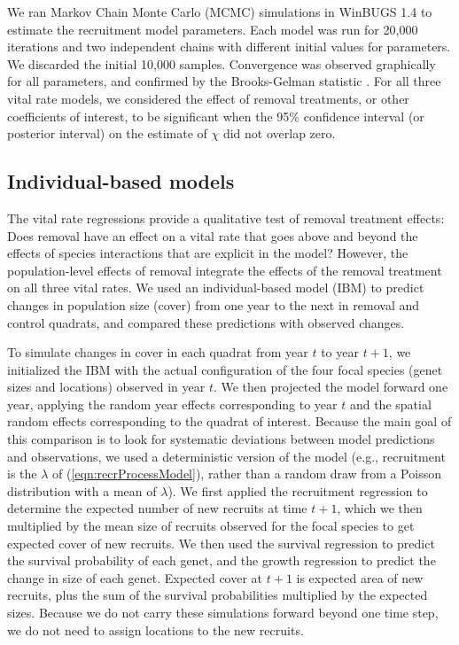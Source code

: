 \documentclass[11pt]{article}
\begin{document}
\begin{doublespacing}
We ran Markov Chain Monte Carlo (MCMC) simulations in WinBUGS 1.4 \citep{lunn_winbugs_2000} to estimate the recruitment model parameters. Each model was run for 20,000 iterations and two independent chains with different initial values for parameters. We discarded the initial 10,000 samples. Convergence was observed graphically for all parameters, and confirmed by the Brooks-Gelman statistic \citep{brooks_general_1998}. For all three vital rate models, we considered the effect of removal treatments, or other coefficients of interest, to be significant when the 95\% confidence interval (or posterior interval) on the estimate of $\chi$ did not overlap zero.  

\subsection*{Individual-based models}

The vital rate regressions provide a qualitative test of removal treatment effects: Does removal have an effect on a vital rate that goes above and beyond the effects of species interactions that are explicit in the model? However, the population-level effects of removal integrate the effects of the removal treatment on all three vital rates. We used an individual-based model (IBM) to predict changes in population size (cover) from one year to the next in removal and control quadrats, and compared these predictions with observed changes. 

To simulate changes in cover in each quadrat from year $t$ to year $t+1$, we initialized the IBM with the actual configuration of the four focal species (genet sizes and locations) observed in year $t$. We then projected the model forward one year, applying the random year effects corresponding to year $t$ and the spatial random effects corresponding to the quadrat of interest. Because the main goal of this comparison is to look for systematic deviations between model predictions and observations, we used a deterministic version of the model (e.g., recruitment is the $\lambda$ of (\ref{eqn:recrProcessModel}), rather than a random draw from a Poisson distribution with a mean of $\lambda$).
We first applied the recruitment regression to determine the expected number of new recruits at time $t+1$, which we then multiplied by the mean size of recruits observed for the focal species to get expected cover of new recruits. We then used the survival regression to predict the survival probability of each genet, and the growth regression to predict the change in size of each genet. Expected cover at $t+1$ is expected area of new recruits, plus the sum of the survival probabilities multiplied by the expected sizes. Because we do not carry these simulations forward beyond one time step, we do not need to assign locations to the new recruits.


\end{doublespacing}
\end{document}
